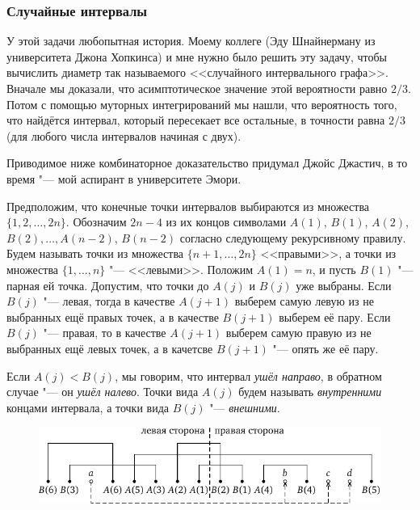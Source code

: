 \documentclass[twoside]{book}
\begin{document}
\subsubsection*{Случайные интервалы}%

У этой задачи любопытная история.
Моему коллеге (Эду Шнайнерману из университета Джона Хопкинса) и мне нужно было решить эту задачу, чтобы вычислить диаметр так называемого <<случайного интервального графа>>. 
Вначале мы доказали, что асимптотическое значение этой вероятности равно $2/3$.
Потом с помощью муторных интегрирований мы нашли, что вероятность того, что найдётся интервал, который пересекает все остальные, в точности равна $2/3$ (для любого числа интервалов начиная с двух).

Приводимое ниже комбинаторное доказательство придумал Джойс Джастич,
в то время "--- мой аспирант в университете Эмори.

\medskip

Предположим, что конечные точки интервалов выбираются из множества
$\{1,2,\dots,2n\}$.
Обозначим $2n-4$ из их концов символами $A(1)$,
$B(1)$, $A(2)$, $B(2),\dots, A(n-2)$, $B(n-2)$ согласно следующему
рекурсивному правилу.
Будем называть точки из множества $\{n+1, \dots
, 2n\}$ <<правыми>>, а точки из множества $\{1, \dots , n\}$ "---
<<левыми>>.
Положим $A(1)=n$, и пусть $B(1)$ "--- парная ей точка.
Допустим, что точки до $A(j)$ и $B(j)$ уже выбраны.
Если $B(j)$ "---
левая, тогда в качестве $A(j+1)$ выберем самую левую из не выбранных
ещё правых точек, а в качестве $B(j+1)$ выберем её пару.
Если $B(j)$
"--- правая, то в качестве $A(j+1)$ выберем самую правую из не
выбранных ещё левых точек, а в качетсве $B(j+1)$ "--- опять же её
пару.

Если $A(j) < B(j)$, мы говорим, что интервал \emph{ушёл направо}, в обратном случае "--- он \emph{ушёл налево}.
Точки вида $A(j)$ будем называть \emph{внутренними} концами интервала,
а точки вида $B(j)$ "--- \emph{вне\-ш\-ними}.

\begin{figure}[!ht]
\centering
\includegraphics{mp/wink-5}
\end{figure} 
\end{document}
